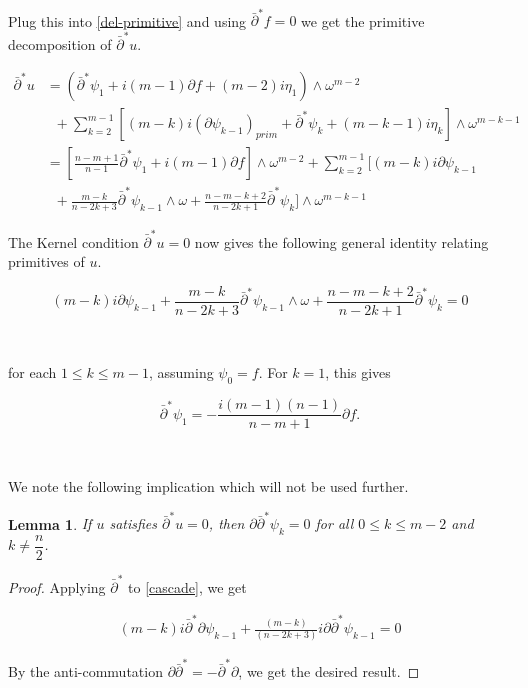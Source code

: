 \documentclass[11pt,letterpaper]{amsart}
\newcommand{\sbpartial}{\bar{\partial}^*}
\newtheorem{lemma}[theorem]{Lemma}
\numberwithin{equation}{section}
\begin{document}
\


Plug this into \eqref{del-primitive} and using $\sbpartial f  =0$ we get the primitive decomposition of $\sbpartial u$.

\begin{equation}
    \begin{aligned}
        \sbpartial u &= (\sbpartial \psi_1 + i(m-1)\partial f + (m-2)i \eta_1) \wedge \omega^{m-2} \\
        &\;\;+ \sum_{k=2}^{m-1}\left[(m-k)i(\partial \psi_{k-1})_{prim} + \sbpartial \psi_{k} + (m-k-1)i\eta_{k}\right]\wedge\omega^{m-k-1}\\
        &=\left[\frac{n-m+1}{n-1}\sbpartial \psi_1 + i(m-1)\partial f \right] \wedge \omega^{m-2}+ \sum_{k=2}^{m-1}\Big[ (m-k)i\partial \psi_{k-1} \\
        &\;\;+ \frac{m-k}{n-2k+ 3} \sbpartial \psi_{k-1} \wedge \omega + \frac{n-m-k+2}{n-2k+1}\sbpartial \psi_{k} \Big]\wedge\omega^{m-k-1}
    \end{aligned}
\end{equation}

The Kernel condition $\sbpartial u =0 $ now gives the following general identity relating primitives of $u$.

\begin{equation}\label{cascade}
    (m-k)i\partial \psi_{k-1} + \frac{m-k}{n-2k+ 3} \sbpartial \psi_{k-1} \wedge \omega + \frac{n-m-k+2}{n-2k+1}\sbpartial \psi_{k} = 0
\end{equation}



\

\noindent for each $1 \leq k \leq m-1 $, assuming $\psi
_0 = f$. For $k=1$, this gives



\begin{equation}\label{primitives12}
    \sbpartial\psi_{1} = -\frac{i(m-1)(n-1)}{n-m+1} \partial f.
\end{equation}

\ 

We note the following implication which will not be used further. 

\begin{lemma}
    If $u$ satisfies $\sbpartial u =0$, then $\partial \sbpartial \psi_{k} = 0$ for all $0 \leq k \leq m-2$ and $k \neq \dfrac{n}{2}$. 

    \end{lemma}

\begin{proof}
    Applying $\sbpartial$ to \eqref{cascade}, we get

\begin{equation}
    \begin{aligned}
        (m-k)i \sbpartial \partial \psi_{k-1} + \frac{(m-k)}{(n-2k+3)} i \partial \sbpartial \psi_{k-1} = 0
    \end{aligned}
\end{equation}

By the anti-commutation $\partial \sbpartial = -\sbpartial \partial$, we get the desired result.



\end{proof}
\end{document}
